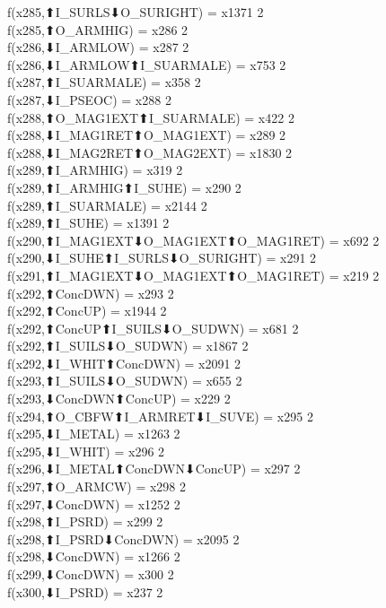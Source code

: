 f(x285,⬆I_SURLS⬇O_SURIGHT) = x1371 {2} \\
f(x285,⬆O_ARMHIG) = x286 {2} \\
f(x286,⬇I_ARMLOW) = x287 {2} \\
f(x286,⬇I_ARMLOW⬆I_SUARMALE) = x753 {2} \\
f(x287,⬆I_SUARMALE) = x358 {2} \\
f(x287,⬇I_PSEOC) = x288 {2} \\
f(x288,⬆O_MAG1EXT⬆I_SUARMALE) = x422 {2} \\
f(x288,⬇I_MAG1RET⬆O_MAG1EXT) = x289 {2} \\
f(x288,⬇I_MAG2RET⬆O_MAG2EXT) = x1830 {2} \\
f(x289,⬆I_ARMHIG) = x319 {2} \\
f(x289,⬆I_ARMHIG⬆I_SUHE) = x290 {2} \\
f(x289,⬆I_SUARMALE) = x2144 {2} \\
f(x289,⬆I_SUHE) = x1391 {2} \\
f(x290,⬆I_MAG1EXT⬇O_MAG1EXT⬆O_MAG1RET) = x692 {2} \\
f(x290,⬇I_SUHE⬆I_SURLS⬇O_SURIGHT) = x291 {2} \\
f(x291,⬆I_MAG1EXT⬇O_MAG1EXT⬆O_MAG1RET) = x219 {2} \\
f(x292,⬆ConcDWN) = x293 {2} \\
f(x292,⬆ConcUP) = x1944 {2} \\
f(x292,⬆ConcUP⬆I_SUILS⬇O_SUDWN) = x681 {2} \\
f(x292,⬆I_SUILS⬇O_SUDWN) = x1867 {2} \\
f(x292,⬇I_WHIT⬆ConcDWN) = x2091 {2} \\
f(x293,⬆I_SUILS⬇O_SUDWN) = x655 {2} \\
f(x293,⬇ConcDWN⬆ConcUP) = x229 {2} \\
f(x294,⬆O_CBFW⬆I_ARMRET⬇I_SUVE) = x295 {2} \\
f(x295,⬇I_METAL) = x1263 {2} \\
f(x295,⬇I_WHIT) = x296 {2} \\
f(x296,⬇I_METAL⬆ConcDWN⬇ConcUP) = x297 {2} \\
f(x297,⬆O_ARMCW) = x298 {2} \\
f(x297,⬇ConcDWN) = x1252 {2} \\
f(x298,⬆I_PSRD) = x299 {2} \\
f(x298,⬆I_PSRD⬇ConcDWN) = x2095 {2} \\
f(x298,⬇ConcDWN) = x1266 {2} \\
f(x299,⬇ConcDWN) = x300 {2} \\
f(x300,⬇I_PSRD) = x237 {2} \\
